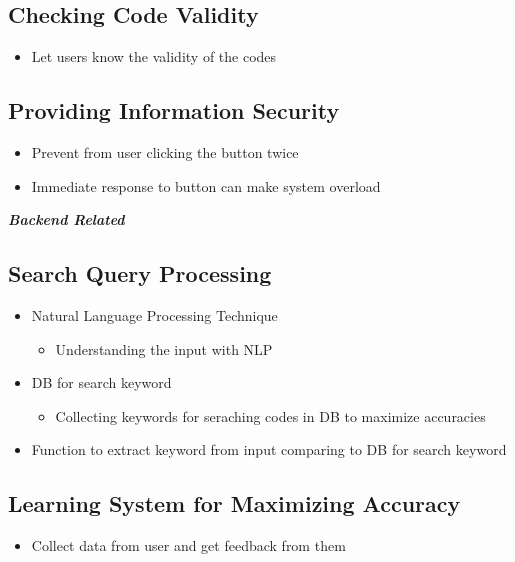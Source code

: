 \documentclass[conference]{IEEEtran}
\begin{document}
\subsection{Checking Code Validity}
\begin{itemize}
  \item Let users know the validity of the codes
\end{itemize}
\textit{ }

\subsection{Providing Information Security}
\begin{itemize}
  \item Prevent from user clicking the button twice
  \item Immediate response to button can make system overload
\end{itemize}
\textit{ }


\textit{\textbf{Backend Related}}
\textit{ }


\subsection{Search Query Processing}
\begin{itemize}
  \item Natural Language Processing Technique
  \begin{itemize}
    \item Understanding the input with NLP
  \end{itemize}
  \item DB for search keyword
  \begin{itemize}
    \item Collecting keywords for seraching codes in DB to maximize accuracies
  \end{itemize}
  \item Function to extract keyword from input comparing to DB for search keyword
\end{itemize}
\textit{ }

\subsection{Learning System for Maximizing Accuracy}
\begin{itemize}
  \item Collect data from user and get feedback from them
\end{itemize}
\textit{ }
\end{document}

